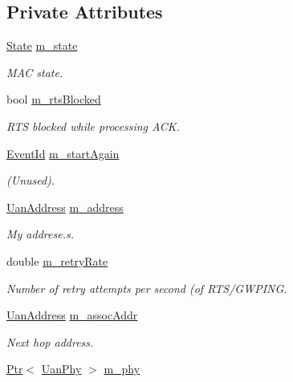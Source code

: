 \subsection*{Private Attributes}
\begin{DoxyCompactItemize}
\item 
\hyperlink{classns3_1_1UanMacRc_ae0dd4b900c5884e250232711ef8274a7}{State} \hyperlink{classns3_1_1UanMacRc_a99267f5ad3a4ac69c0708414974dcb39}{m\+\_\+state}
\begin{DoxyCompactList}\small\item\em M\+AC state. \end{DoxyCompactList}\item 
bool \hyperlink{classns3_1_1UanMacRc_aa85fcd87a24f6ebb5425cbd5f08a6205}{m\+\_\+rts\+Blocked}
\begin{DoxyCompactList}\small\item\em R\+TS blocked while processing A\+CK. \end{DoxyCompactList}\item 
\hyperlink{classns3_1_1EventId}{Event\+Id} \hyperlink{classns3_1_1UanMacRc_a1e965b39691ded14a5ab7204d0859312}{m\+\_\+start\+Again}
\begin{DoxyCompactList}\small\item\em (Unused). \end{DoxyCompactList}\item 
\hyperlink{classns3_1_1UanAddress}{Uan\+Address} \hyperlink{classns3_1_1UanMacRc_ac389a0236fcf75155c45a9a1cdf0f288}{m\+\_\+address}
\begin{DoxyCompactList}\small\item\em My addrese.\+s. \end{DoxyCompactList}\item 
double \hyperlink{classns3_1_1UanMacRc_a05998afbcd688ef3c86d762e38ed3927}{m\+\_\+retry\+Rate}
\begin{DoxyCompactList}\small\item\em Number of retry attempts per second (of R\+T\+S/\+G\+W\+P\+I\+NG. \end{DoxyCompactList}\item 
\hyperlink{classns3_1_1UanAddress}{Uan\+Address} \hyperlink{classns3_1_1UanMacRc_a67110fd422cdfab5b7d3b47fca059916}{m\+\_\+assoc\+Addr}
\begin{DoxyCompactList}\small\item\em Next hop address. \end{DoxyCompactList}\item 
\hyperlink{classns3_1_1Ptr}{Ptr}$<$ \hyperlink{classns3_1_1UanPhy}{Uan\+Phy} $>$ \hyperlink{classns3_1_1UanMacRc_a48df505a0f7a921a3a279523e7390db8}{m\+\_\+phy}

\end{DoxyCompactItemize}
